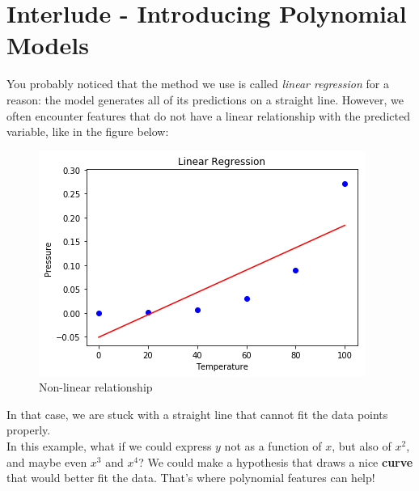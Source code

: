
\section*{Interlude - Introducing Polynomial Models}

You probably noticed that the method we use is called \textit{linear regression} for a reason:
the model generates all of its predictions on a straight line.
However, we often encounter features that do not have a linear relationship with the predicted variable,
like in the figure below:

\begin{figure}[!h]
    \centering
    \includegraphics[scale=0.6]{assets/polynomial_straight_line.png}
    \caption{Non-linear relationship}
\end{figure}
In that case, we are stuck with a straight line that cannot fit the data points properly.\\
\newline
In this example, what if we could express $y$ not as a function of $x$, but also of $x^2$, and maybe even $x^3$ and $x^4$?
We could make a hypothesis that draws a nice \textbf{curve} that would better fit the data.
That's where polynomial features can help!

